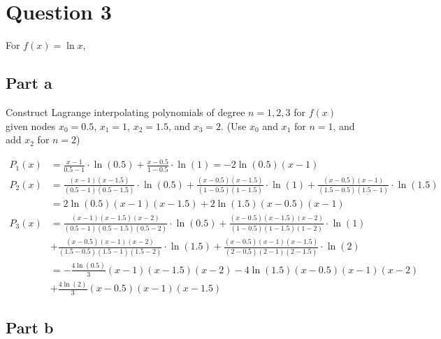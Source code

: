 \section{Question 3}

\begin{question}
    For $f(x) = \ln x$,
\end{question}

\subsection{Part a}

\begin{question}
    Construct Lagrange interpolating polynomials of degree $n = 1,2,3$ for $f(x)$ given nodes $x_0 = 0.5$, $x_1 = 1$, $x_2 = 1.5$, and $x_3 = 2$. (Use $x_0$ and $x_1$ for $n = 1$, and add $x_2$ for $n = 2$)
\end{question}

\begin{answer}
    \begin{align}
        P_1(x) &= \tfrac{x - 1}{0.5 - 1}\cdot \ln{(0.5)}+\tfrac{x - 0.5}{1 - 0.5} \cdot \ln{(1)} = -2\ln{(0.5)}(x - 1)\\
        P_2(x) &= \tfrac{(x - 1)(x - 1.5)}{(0.5 - 1)(0.5 - 1.5)} \cdot \ln{(0.5)} + \tfrac{(x - 0.5)(x - 1.5)}{(1 - 0.5)(1 - 1.5)} \cdot \ln{(1)} + \tfrac{(x - 0.5)(x - 1)}{(1.5 - 0.5)(1.5 - 1)} \cdot \ln{(1.5)}\\
        &= 2\ln{(0.5)}(x - 1)(x - 1.5) + 2\ln{(1.5)}(x - 0.5)(x - 1)\\
        P_3(x) &= \tfrac{(x - 1)(x - 1.5)(x - 2)}{(0.5 - 1)(0.5 - 1.5)(0.5 - 2)} \cdot \ln{(0.5)} + \tfrac{(x - 0.5)(x - 1.5)(x - 2)}{(1 - 0.5)(1 - 1.5)(1 - 2)} \cdot \ln{(1)}\\
        &+ \tfrac{(x - 0.5)(x - 1)(x - 2)}{(1.5 - 0.5)(1.5 - 1)(1.5 - 2)} \cdot \ln{(1.5)} + \tfrac{(x - 0.5)(x - 1)(x - 1.5)}{(2 - 0.5)(2 - 1)(2 - 1.5)} \cdot \ln{(2)}\\
        &= - \tfrac{4\ln{(0.5)}}{3}(x - 1)(x - 1.5)(x - 2) - 4\ln{(1.5)}(x - 0.5)(x - 1)(x - 2)\\
        &+ \tfrac{4\ln{(2)}}{3}(x - 0.5)(x - 1)(x - 1.5)
    \end{align}    
\end{answer}

\subsection{Part b}

